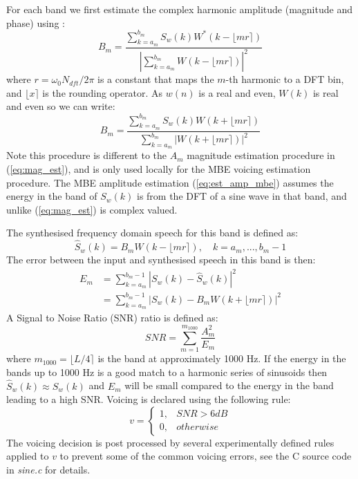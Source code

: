 \documentclass{article}
\begin{document}
For each band we first estimate the complex harmonic amplitude (magnitude and phase) using \cite{griffin1988multiband}:
\begin{equation}
B_m = \frac{\sum_{k=a_m}^{b_m} S_w(k) W^* (k - \lfloor mr \rceil)}{|\sum_{k=a_m}^{b_m} W (k - \lfloor mr \rceil)|^2}
\end{equation}
where $r= \omega_0 N_{dft}/2 \pi$ is a constant that maps the $m$-th harmonic to a DFT bin, and $ \lfloor x \rceil$ is the rounding operator.  As $w(n)$ is a real and even, $W(k)$ is real and even so we can write:
\begin{equation}
\label{eq:est_amp_mbe}
B_m = \frac{\sum_{k=a_m}^{b_m} S_w(k) W (k + \lfloor mr \rceil)}{\sum_{k=a_m}^{b_m} |W (k + \lfloor mr \rceil)|^2}
\end{equation}
Note this procedure is different to the $A_m$ magnitude estimation procedure in (\ref{eq:mag_est}), and is only used locally for the MBE voicing estimation procedure.  The MBE amplitude estimation (\ref{eq:est_amp_mbe}) assumes the energy in the band of $S_w(k)$ is from the DFT of a sine wave in that band, and unlike (\ref{eq:mag_est}) is complex valued.

The synthesised frequency domain speech for this band is defined as:
\begin{equation}
\hat{S}_w(k) = B_m W(k - \lfloor mr \rceil), \quad k=a_m,...,b_m-1
\end{equation}
The error between the input and synthesised speech in this band is then:
\begin{equation}
\begin{split}
E_m &= \sum_{k=a_m}^{b_m-1} |S_w(k) - \hat{S}_w(k)|^2 \\
    &=\sum_{k=a_m}^{b_m-1} |S_w(k) - B_m W(k + \lfloor mr \rceil)|^2
\end{split}
\end{equation}
A Signal to Noise Ratio (SNR) ratio is defined as:
\begin{equation}
SNR = \sum_{m=1}^{m_{1000}} \frac{A^2_m}{E_m}
\end{equation}
where $m_{1000}= \lfloor L/4 \rceil$ is the band at approximately 1000 Hz. If the energy in the bands up to 1000 Hz is a good match to a harmonic series of sinusoids then $\hat{S}_w(k) \approx S_w(k)$ and $E_m$ will be small compared to the energy in the band leading to a high SNR.  Voicing is declared using the following rule:
\begin{equation}
v = \begin{cases}
    1, & SNR > 6 dB \\
    0, & otherwise
    \end{cases}
\end{equation}
The voicing decision is post processed by several experimentally defined rules applied to $v$ to prevent some of the common voicing errors, see the C source code in \emph{sine.c} for details.
\end{document}
